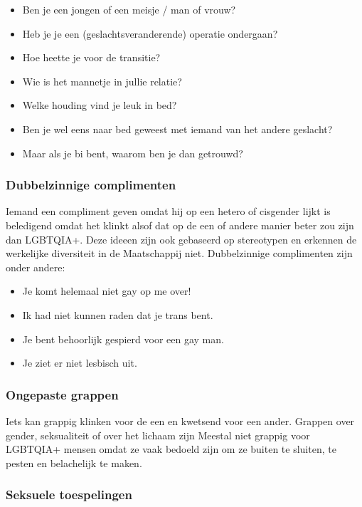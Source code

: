 \documentclass[12pt,openany]{book}
\begin{document}
\begin{itemize}
  \item Ben je een jongen of een meisje / man of vrouw?
  \item Heb je je een (geslachtsveranderende) operatie ondergaan?
  \item Hoe heette je voor de transitie?
  \item Wie is het mannetje in jullie relatie?
  \item Welke houding vind je leuk in bed?
  \item Ben je wel eens naar bed geweest met iemand van het andere geslacht?
  \item Maar als je bi bent, waarom ben je dan getrouwd?
\end{itemize}

\subsubsection*{Dubbelzinnige complimenten}

Iemand een compliment geven omdat hij op een hetero of cisgender lijkt is beledigend omdat het klinkt alsof dat op de een of andere manier beter zou zijn dan LGBTQIA+. Deze ideeen zijn ook gebaseerd op stereotypen en erkennen de werkelijke diversiteit in de Maatschappij niet. Dubbelzinnige complimenten zijn onder andere: 

\begin{itemize}
  \item Je komt helemaal niet gay op me over!
  \item Ik had niet kunnen raden dat je trans bent.
  \item Je bent behoorlijk gespierd voor een gay man.
  \item Je ziet er niet lesbisch uit.
\end{itemize}

\subsubsection*{Ongepaste grappen} 

Iets kan grappig klinken voor de een en kwetsend voor een ander. Grappen over gender, seksualiteit of over het lichaam zijn Meestal niet grappig voor LGBTQIA+ mensen omdat ze vaak bedoeld zijn om ze buiten te sluiten, te pesten en belachelijk te maken. 

\subsubsection*{Seksuele toespelingen}
\end{document}
